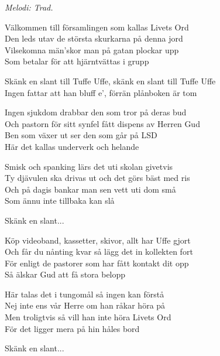 {\footnotesize\textit{Melodi: Trad.}}\par
\vspace{10pt}
Välkommen till församlingen som kallas Livets Ord\\
Den leds utav de största skurkarna på denna jord\\
Vilsekomna män’skor man på gatan plockar upp\\
Som betalar för att hjärntvättas i grupp\par
\vspace{10pt}
Skänk en slant till Tuffe Uffe, skänk en slant till Tuffe Uffe\\
Ingen fattar att han bluff e’, förrän plånboken är tom

Ingen sjukdom drabbar den som tror på deras bud\\
Och pastorn för sitt synfel fått dispens av Herren Gud\\
Ben som växer ut ser den som går på LSD\\
Här det kallas underverk och helande\par
\vspace{10pt}
Smisk och spanking lärs det uti skolan givetvis\\
Ty djävulen ska drivas ut och det görs bäst med ris\\
Och på dagis bankar man sen vett uti dom små\\
Som ännu inte tillbaka kan slå\par
\vspace{10pt}
Skänk en slant...\par
\vspace{10pt}
Köp videoband, kassetter, skivor, allt har Uffe gjort\\
Och får du nånting kvar så lägg det in kollekten fort\\
För enligt de pastorer som har fått kontakt dit opp\\
Så älskar Gud att få stora belopp\par
\vspace{10pt}
Här talas det i tungomål så ingen kan förstå\\
Nej inte ens vår Herre om han råkar höra på\\
Men troligtvis så vill han inte höra Livets Ord\\
För det ligger mera på hin håles bord\par
\vspace{10pt}
Skänk en slant...\par

